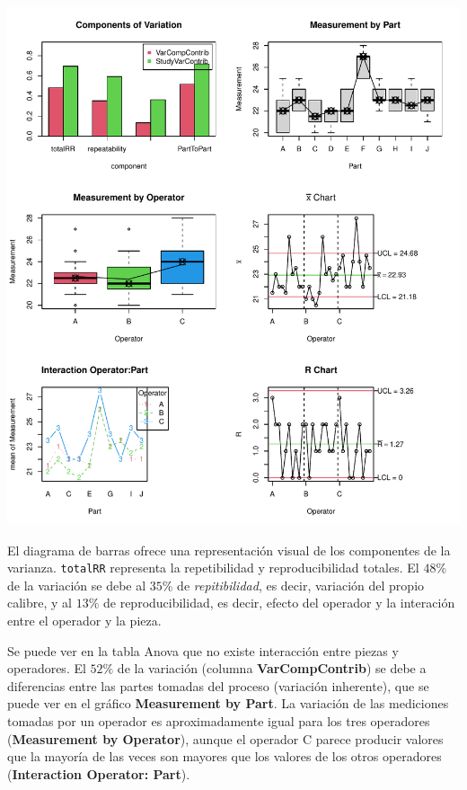 \documentclass[
]{book}
\begin{document}
\begin{center}\includegraphics{Libro_TidyQualityTools_files/figure-latex/unnamed-chunk-83-1} \end{center}

El diagrama de barras ofrece una representación visual de los componentes de la varianza. \texttt{totalRR} representa la repetibilidad y reproducibilidad totales. El \(48\%\) de la variación se debe al \(35\%\) de \emph{repitibilidad}, es decir, variación del propio calibre, y al \(13\%\) de reproducibilidad, es decir, efecto del operador y la interación entre el operador y la pieza.

Se puede ver en la tabla Anova que no existe interacción entre piezas y operadores. El \(52\%\) de la variación (columna \textbf{VarCompContrib}) se debe a diferencias entre las partes tomadas del proceso (variación inherente), que se puede ver en el gráfico \textbf{Measurement by Part}. La variación de las mediciones tomadas por un operador es aproximadamente igual para los tres operadores (\textbf{Measurement by Operator}), aunque el operador C parece producir valores que la mayoría de las veces son mayores que los valores de los otros operadores (\textbf{Interaction Operator: Part}).
\end{document}
